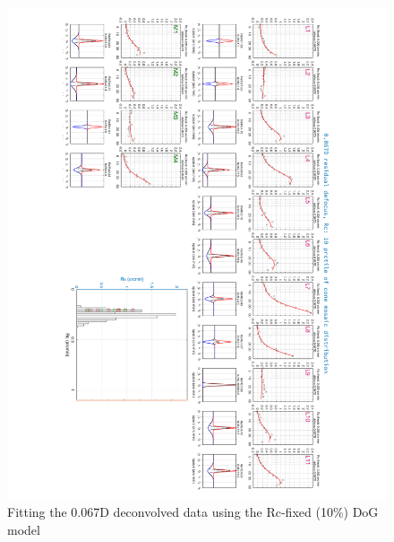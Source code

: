 \documentclass[11pt, oneside]{article}   	%
\begin{document}
\begin{figure}[htbp] %
   \centering
   \includegraphics[width=7in]{Slide5.pdf} 
   \caption{Fitting the 0.067D deconvolved data using the Rc-fixed (10\%) DoG model}
   \label{fig:example}
\end{figure}
\end{document}
